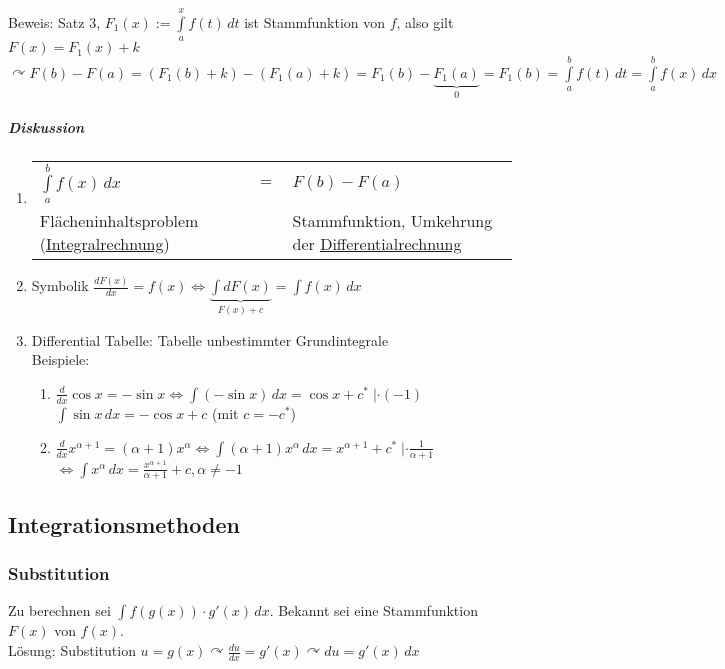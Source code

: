 \documentclass[a4paper]{scrartcl}
\begin{document}
Beweis: Satz 3, $F_1(x) := \int\limits_a^x f(t) \, dt$ ist Stammfunktion von $f$, also gilt $F(x) = F_1(x) + k$\\
$\curvearrowright F(b) - F(a) = (F_1(b) + k) - (F_1(a) +k) = F_1(b) - \underbrace{F_1(a)}_{0} = F_1(b) = \int\limits_a^b f(t) \, dt = \int\limits_a^b f(x) \, dx$

\subparagraph{Diskussion}
\begin{enumerate}
\item \begin{tabular}{p{5cm}p{1cm}p{5cm}} $\int\limits_a^b f(x) \, dx$ & $ =$ & $ F(b) - F(a)$ \\
Flächeninhaltsproblem (\underline{\underline{Integralrechnung}}) && Stammfunktion, Umkehrung der \underline{\underline{Differentialrechnung}}\\ \end{tabular}
\item Symbolik $\frac{dF(x)}{dx} = f(x) \Leftrightarrow \underbrace{\int dF(x)}_{F(x)+c} = \int f(x) \, dx$
\item Differential Tabelle: Tabelle unbestimmter Grundintegrale\\
Beispiele:
\begin{enumerate}
\item $\frac{d}{dx} \cos{x} = - \sin{x} \Leftrightarrow \int (-\sin{x}) \, dx = \cos{x} + c^* \; | \cdot (-1)$\\
$\int\sin{x} \, dx = - \cos{x} +c$ (mit $c = -c^*$)
\item $\frac{d}{dx} x^{\alpha +1} = (\alpha +1 ) x^\alpha \Leftrightarrow \int (\alpha +1) x^\alpha \, dx = x^{\alpha +1} + c^* \; | \cdot \frac{1}{\alpha +1}$\\ $  \Leftrightarrow \int x^\alpha \, dx = \frac{x^{\alpha +1}}{\alpha +1} +c, \alpha \neq -1$
\end{enumerate}

\end{enumerate}

\subsection{Integrationsmethoden}
\subsubsection{Substitution}
Zu berechnen sei $\int f (g(x)) \cdot g'(x) \, dx$. Bekannt sei eine Stammfunktion $F(x)$ von $f(x)$.\\
Lösung: Substitution $u=g(x) \curvearrowright \frac{du}{dx} = g'(x) \curvearrowright du = g'(x) \, dx$
\end{document}
